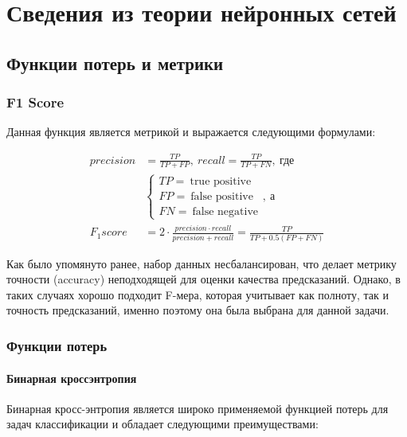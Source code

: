 \chapter{Сведения из теории нейронных сетей}

\section{Функции потерь и метрики}
\subsection{F1 Score}
Данная функция является метрикой и выражается следующими формулами:

\begin{align*}
	precision & = \frac{TP}{TP + FP}, \: recall = \frac{TP}{TP + FN}, \: \text{где}                        \\
	          & \begin{cases}
		            TP = \: \text{true positive}  \\
		            FP = \: \text{false positive} \\
		            FN = \: \text{false negative}
	            \end{cases}, \: \text{а}                                                              \\
	F_1score  & = 2 \cdot \frac{precision \cdot recall}{precision + recall} = \frac{TP}{TP + 0.5(FP + FN)}
\end{align*}

Как было упомянуто ранее, набор данных несбалансирован, что делает метрику точности
(accuracy) неподходящей для оценки качества предсказаний. Однако, в таких
случаях хорошо подходит F-мера, которая учитывает как полноту, так и точность
предсказаний, именно поэтому она была выбрана для данной задачи.

\subsection{Функции потерь}
\subsubsection{Бинарная кроссэнтропия}

Бинарная кросс-энтропия является широко применяемой функцией потерь для задач
классификации и обладает следующими преимуществами:

